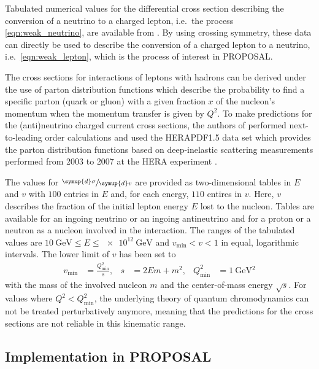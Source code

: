 Tabulated numerical values for the differential cross section describing the conversion of a neutrino to a charged lepton, i.e.\ the process \eqref{eqn:weak_neutrino}, are available from \cite{Cooper_Sarkar_2011}.
By using crossing symmetry, these data can directly be used to describe the conversion of a charged lepton to a neutrino, i.e.\ \eqref{eqn:weak_lepton}, which is the process of interest in PROPOSAL.

The cross sections for interactions of leptons with hadrons can be derived under the use of parton distribution functions which describe the probability to find a specific parton (quark or gluon) with a given fraction $x$ of the nucleon's momentum when the momentum transfer is given by $Q^2$.
To make predictions for the (anti)neutrino charged current cross sections, the authors of \cite{Cooper_Sarkar_2011} performed next-to-leading order calculations and used the HERAPDF1.5 data set which provides the parton distribution functions based on deep-inelastic scattering measurements performed from 2003 to 2007 at the HERA experiment \cite{am2010proton}.

The values for $\sfrac{\symup{d}\sigma}{\symup{d}v}$ are provided as two-dimensional tables in $E$ and $v$ with $\num{100}$ entries in $E$ and, for each energy, $\num{110}$ entires in $v$.  
Here, $v$ describes the fraction of the initial lepton energy $E$ lost to the nucleon.
Tables are available for an ingoing neutrino or an ingoing antineutrino and for a proton or a neutron as a nucleon involved in the interaction.
The ranges of the tabulated values are $\SI{10}{\giga\electronvolt} \leq E \leq \SI{e12}{\giga\electronvolt}$ and $v_\text{min} < v < 1$ in equal, logarithmic intervals.
The lower limit of $v$ has been set to
%
\begin{align}
    v_\text{min} &= \frac{Q^2_{\text{min}}}{s}, & s &= 2 E m + m^2, & Q^2_{\text{min}} &= \SI{1}{\giga\electronvolt^2}
\end{align}
%
with the mass of the involved nucleon $m$ and the center-of-mass energy $\sqrt{s}$.
For values where $Q^2 < Q_\text{min}^2$, the underlying theory of quantum chromodynamics can not be treated perturbatively anymore, meaning that the predictions for the cross sections are not reliable in this kinematic range. 

\subsection{Implementation in PROPOSAL}
\label{sec:weak_implementation}


